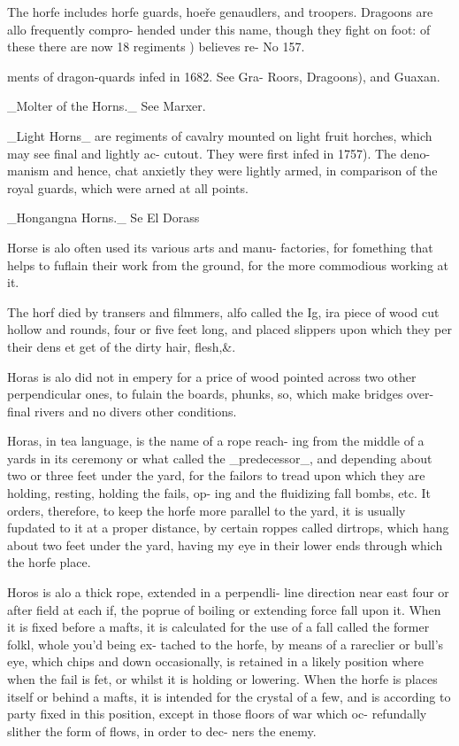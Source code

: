 \documentclass{article}
\begin{document}
The horfe includes horfe guards, hoeře genaudlers,
and troopers. Dragoons are allo frequently compro-
hended under this name, though they fight on foot:
of these there are now 18 regiments ) believes re-
No 157.

ments of dragon-quards infed in 1682. See Gra-
Roors, Dragoons), and Guaxan.

\_Molter of the Horns.\_ See Marxer.

\_Light Horns\_ are regiments of cavalry mounted on
light fruit horches, which may see final and lightly ac-
cutout. They were first infed in 1757). The deno-
manism and hence, chat anxietly they were lightly
armed, in comparison of the royal guards, which were
arned at all points.

\_Hongangna Horns.\_ Se El Dorass

Horse is alo often used its various arts and manu-
factories, for fomething that helps to fuflain their
work from the ground, for the more commodious
working at it.

The horf died by transers and filmmers, alfo called
the Ig, ira piece of wood cut hollow and rounds,
four or five feet long, and placed slippers upon which
they per their dens et get of the dirty hair, flesh,\&.

Horas is alo did not in empery for a price of wood
pointed across two other perpendicular ones, to fulain
the boards, phunks, so, which make bridges over-final
rivers and no divers other conditions.

Horas, in tea language, is the name of a rope reach-
ing from the middle of a yards in its ceremony or what
called the \_predecessor\_, and depending about two or
three feet under the yard, for the failors to tread upon
which they are holding, resting, holding the fails, op-
ing and the fluidizing fall bombs, etc. It orders, therefore, to keep the horfe more parallel to the yard, it is
usually fupdated to it at a proper distance, by certain
roppes called dirtrops, which hang about two feet under
the yard, having my eye in their lower ends through
which the horfe place.

Horos is alo a thick rope, extended in a perpendli-
line direction near east four or after field at each if,
the poprue of boiling or extending force fall upon it.
When it is fixed before a mafts, it is calculated for the
use of a fall called the former folkl, whole you'd being ex-
tached to the horfe, by means of a rareclier or bull's
eye, which chips and down occasionally, is retained
in a likely position where when the fail is fet, or
whilst it is holding or lowering. When the horfe is
places itself or behind a mafts, it is intended for the
crystal of a few, and is according to party fixed
in this position, except in those floors of war which oc-
refundally slither the form of flows, in order to dec-
ners the enemy.
\end{document}
